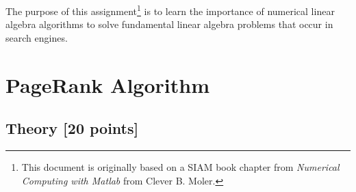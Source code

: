 \documentclass[unicode,11pt,a4paper,oneside,numbers=endperiod,openany]{scrartcl}
\begin{document}
\setassignment
{}

\newline

\assignmentpolicy
The purpose of this assignment\footnote{This document is originally based on a SIAM book chapter from \textsl{Numerical Computing with Matlab} from  Clever B. Moler.} is to learn the importance of numerical linear algebra algorithms to solve fundamental  linear algebra problems that occur in search engines.



\section*{PageRank Algorithm }

\subsection{Theory [20 points]}
\end{document}
